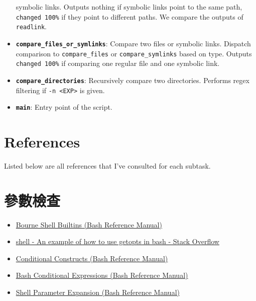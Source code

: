 \documentclass[12pt, a4paper]{article}
\begin{document}
\begin{itemize}
      symbolic links. Outputs nothing if symbolic links point to the same path,
      \texttt{changed 100\%} if they point to different paths. We compare the
      outputs of \texttt{readlink}.
    \item \textbf{\texttt{compare\_files\_or\_symlinks}}: Compare two files or
      symbolic links. Dispatch comparison to \verb|compare_files| or
      \verb|compare_symlinks| based on type. Outputs \texttt{changed 100\%} if
      comparing one regular file and one symbolic link.
    \item \textbf{\texttt{compare\_directories}}: Recursively compare two
      directories. Performs regex filtering if \texttt{-n <EXP>} is given.
    \item \textbf{\texttt{main}}: Entry point of the script.
  \end{itemize}

  \section*{References}
  Listed below are all references that I've consulted for each subtask.
  \section{參數檢查}
  \begin{itemize}
    \item \href{https://www.gnu.org/software/bash/manual/html_node/Bourne-Shell-Builtins.html}{Bourne Shell Builtins (Bash Reference Manual)}
    \item \href{https://stackoverflow.com/questions/16483119/an-example-of-how-to-use-getopts-in-bash}{shell - An example of how to use getopts in bash - Stack Overflow}
    \item \href{https://www.gnu.org/software/bash/manual/html_node/Conditional-Constructs.html}{Conditional Constructs (Bash Reference Manual)}
    \item \href{https://www.gnu.org/software/bash/manual/html_node/Bash-Conditional-Expressions.html}{Bash Conditional Expressions (Bash Reference Manual)}
    \item \href{https://www.gnu.org/software/bash/manual/html_node/Shell-Parameter-Expansion.html}{Shell Parameter Expansion (Bash Reference Manual)}
  \end{itemize}
\end{document}
